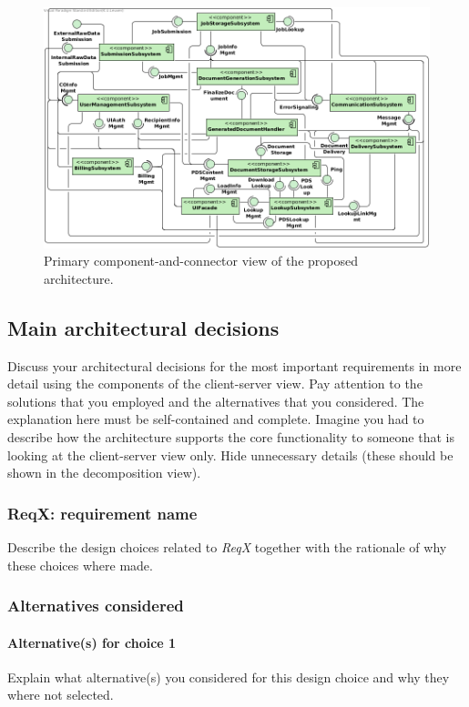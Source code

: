 \begin{figure}[!htp]
    \centering
    \includegraphics[width=\textwidth]{figures/Subsystem Diagram.png}
    \caption{Primary component-and-connector view of the proposed architecture.}\label{fig:cs-primary}
\end{figure}

\subsection{Main architectural decisions}
Discuss your architectural decisions for the most important requirements in
more detail using the components of the client-server view.
Pay attention to the solutions that you employed and the alternatives that you
considered.
The explanation here must be self-contained and complete.
Imagine you had to describe how the architecture supports the core
functionality to someone that is looking at the client-server view only.
Hide unnecessary details (these should be shown in the decomposition view).

\subsubsection{ReqX\@: requirement name}
Describe the design choices related to \emph{ReqX} together with the rationale
of why these choices where made.

\subsubsection*{Alternatives considered}
\paragraph{Alternative(s) for choice 1} Explain what alternative(s) you
considered for this design choice and why they where not selected.
